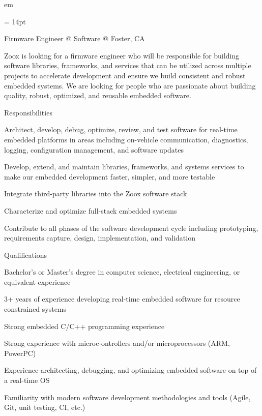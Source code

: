 

 em

\FFrf \baselineskip = 14pt



\centerline{
Firmware Engineer @ Software @ Foster, CA
} 

\par Zoox is looking for a firmware engineer who will be responsible for building software libraries, frameworks, and services that can be utilized across multiple projects to accelerate development and ensure we build consistent and robust embedded systems. We are looking for people who are passionate about building quality, robust, optimized, and reusable embedded software.
\par Responsibilities
\par Architect, develop, debug, optimize, review, and test software for real-time embedded platforms in areas including on-vehicle communication, diagnostics, logging, configuration management, and software updates
\par Develop, extend, and maintain libraries, frameworks, and systems services to make our embedded development faster, simpler, and more testable
\par Integrate third-party libraries into the Zoox software stack
\par Characterize and optimize full-stack embedded systems
\par Contribute to all phases of the software development cycle including prototyping, requirements capture, design, implementation, and validation
\par Qualifications
\par Bachelor’s or Master’s degree in computer science, electrical engineering, or equivalent experience
\par 3+ years of experience developing real-time embedded software for resource constrained systems
\par Strong embedded C/C++ programming experience
\par Strong experience with microc-ontrollers and/or microprocessors (ARM, PowerPC)
\par Experience architecting, debugging, and optimizing embedded software on top of a real-time OS
\par Familiarity with modern software development methodologies and tools (Agile, Git, unit testing, CI, etc.)
